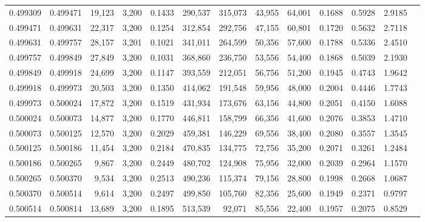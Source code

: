 \begin{tabular}{rrrrrrrrrrrrr}
0.499309 & 0.499471 & 19,123 & 3,200 &                                     0.1433 & 290,537 & 315,073 &  43,955 &  64,001 & 0.1688 & 0.5928 & 2.9185 \\
0.499471 & 0.499631 & 22,317 & 3,200 &                                     0.1254 & 312,854 & 292,756 &  47,155 &  60,801 & 0.1720 & 0.5632 & 2.7118 \\
0.499631 & 0.499757 & 28,157 & 3,201 &                                     0.1021 & 341,011 & 264,599 &  50,356 &  57,600 & 0.1788 & 0.5336 & 2.4510 \\
0.499757 & 0.499849 & 27,849 & 3,200 &                                     0.1031 & 368,860 & 236,750 &  53,556 &  54,400 & 0.1868 & 0.5039 & 2.1930 \\
0.499849 & 0.499918 & 24,699 & 3,200 &                                     0.1147 & 393,559 & 212,051 &  56,756 &  51,200 & 0.1945 & 0.4743 & 1.9642 \\
0.499918 & 0.499973 & 20,503 & 3,200 &                                     0.1350 & 414,062 & 191,548 &  59,956 &  48,000 & 0.2004 & 0.4446 & 1.7743 \\
0.499973 & 0.500024 & 17,872 & 3,200 &                                     0.1519 & 431,934 & 173,676 &  63,156 &  44,800 & 0.2051 & 0.4150 & 1.6088 \\
0.500024 & 0.500073 & 14,877 & 3,200 &                                     0.1770 & 446,811 & 158,799 &  66,356 &  41,600 & 0.2076 & 0.3853 & 1.4710 \\
0.500073 & 0.500125 & 12,570 & 3,200 &                                     0.2029 & 459,381 & 146,229 &  69,556 &  38,400 & 0.2080 & 0.3557 & 1.3545 \\
0.500125 & 0.500186 & 11,454 & 3,200 &                                     0.2184 & 470,835 & 134,775 &  72,756 &  35,200 & 0.2071 & 0.3261 & 1.2484 \\
0.500186 & 0.500265 &  9,867 & 3,200 &                                     0.2449 & 480,702 & 124,908 &  75,956 &  32,000 & 0.2039 & 0.2964 & 1.1570 \\
0.500265 & 0.500370 &  9,534 & 3,200 &                                     0.2513 & 490,236 & 115,374 &  79,156 &  28,800 & 0.1998 & 0.2668 & 1.0687 \\
0.500370 & 0.500514 &  9,614 & 3,200 &                                     0.2497 & 499,850 & 105,760 &  82,356 &  25,600 & 0.1949 & 0.2371 & 0.9797 \\
0.500514 & 0.500814 & 13,689 & 3,200 &                                     0.1895 & 513,539 &  92,071 &  85,556 &  22,400 & 0.1957 & 0.2075 & 0.8529 \\

\end{tabular}
